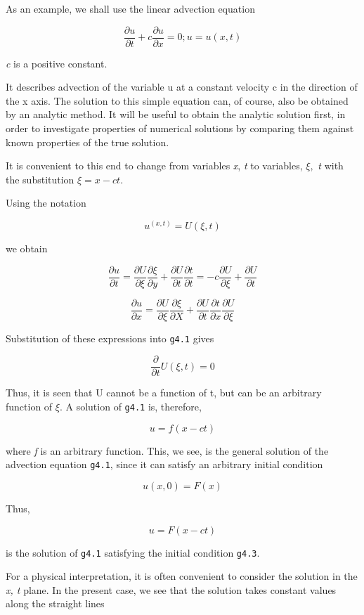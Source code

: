 As an example, we shall use the linear advection equation

    \[\frac{\partial u}{\partial t} +c\frac{\partial u}{\partial x } = 0; u =u(x,t)\]

\emph{c} is a positive constant.

It describes advection of the variable u at a constant velocity c in the
direction of the x axis. The solution to this simple equation can, of
course, also be obtained by an analytic method. It will be useful to
obtain the analytic solution first, in order to investigate properties
of numerical solutions by comparing them against known properties of the
true solution.

It is convenient to this end to change from variables \emph{x}, \emph{t}
to variables, \(\xi,\) \emph{t} with the substitution \(\xi = x - ct\).

Using the notation

\[u^{(x,t)} = U (\xi, t)\]

we obtain

\[\frac{\partial u}{\partial t} = \frac{\partial U}{\partial\xi}\frac{\partial\xi}{\partial y} +
\frac{\partial U}{\partial t}\frac{\partial t}{\partial t} =-c\frac{\partial U}{\partial\xi}+
\frac{\partial U}{\partial t}\]

\[\frac{\partial u}{\partial x} =\frac{\partial U}{\partial\xi}\frac{\partial\xi}{\partial X}
+ \frac{\partial U}{\partial t}\frac{\partial t}{\partial x}\frac{\partial U}{\partial\xi}\]

Substitution of these expressions into \texttt{g4.1} gives

\[\frac{\partial}{\partial t}U(\xi,t) = 0\]

Thus, it is seen that U cannot be a function of t, but can be an
arbitrary function of \(\xi\). A solution of \texttt{g4.1} is,
therefore,

    \[u = f(x - ct)\]

where \emph{f} is an arbitrary function. This, we see, is the general
solution of the advection equation \texttt{g4.1}, since it can satisfy
an arbitrary initial condition

    \[u(x,0) = F(x)\]

Thus,

    \[u = F \left( x - ct \right)\]

is the solution of \texttt{g4.1} satisfying the initial condition
\texttt{g4.3}.

For a physical interpretation, it is often convenient to consider the
solution in the \emph{x, t} plane. In the present case, we see that the
solution takes constant values along the straight lines

